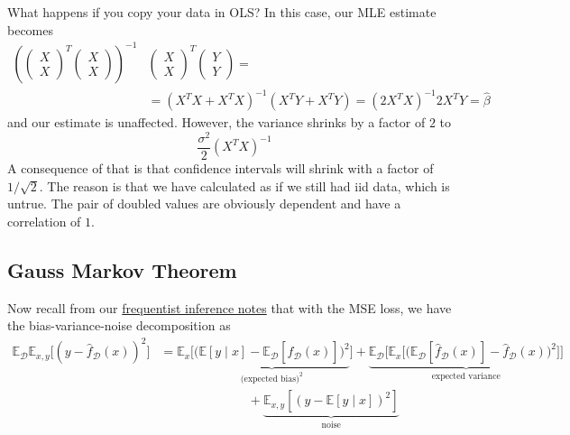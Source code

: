   \begin{example}
    \label{ex:copying-data}
    What happens if you copy your data in OLS? In this case, our MLE estimate becomes 
    \begin{align*}
        \left(\begin{pmatrix}X \\ X \end{pmatrix}^T \begin{pmatrix} X \\ X \end{pmatrix} \right )^{-1} & \begin{pmatrix} X \\ X  \end{pmatrix}^T \begin{pmatrix} Y \\ Y  \end{pmatrix}  =\\
    & = (X^T X + X^T X)^{-1} (X^T Y + X^T Y ) = (2 X^T X)^{-1} 2 X^T Y = \hat{\beta}
    \end{align*}
    and our estimate is unaffected. However, the variance shrinks by a factor of $2$ to 
    \begin{equation}
      \frac{\sigma^2}{2} (X^T X)^{-1}
    \end{equation}
    A consequence of that is that confidence intervals will shrink with a factor of $1/\sqrt{2}$. The reason is that we have calculated as if we still had iid data, which is untrue. The pair of doubled values are obviously dependent and have a correlation of $1$. 
  \end{example}

\subsection{Gauss Markov Theorem}

  Now recall from our \hyperref[fi-bias_variance_mse]{frequentist inference notes} that with the MSE loss, we have the bias-variance-noise decomposition as 
  \begin{align}
    \mathbb{E}_{\mathcal{D}} \mathbb{E}_{x, y} \big[ (y - \hat{f}_{\mathcal{D}}(x))^2 \big] 
    & = \mathbb{E}_{x} \big[ \underbrace{ \big( \mathbb{E}[y \mid x] - \mathbb{E}_{\mathcal{D}} [\hat{f}_\mathcal{D} (x)] \big)^2}_{\text{(expected bias)}^2} \big] + \underbrace{ \mathbb{E}_\mathcal{D} \big[ \mathbb{E}_{x} \big[ \big( \mathbb{E}_\mathcal{D} [\hat{f}_\mathcal{D} (x)] - \hat{f}_\mathcal{D} (x) \big)^2 \big] \big]}_{\text{expected variance}} \\ 
    & \;\;\;\;\;\;\;\;\;\;\;\;\;\;\;\;\;\;\;\;\;\;\;\;\; + \underbrace{\mathbb{E}_{x, y} [(y - \mathbb{E}[y \mid x])^2]}_{\text{noise}}
  \end{align}

